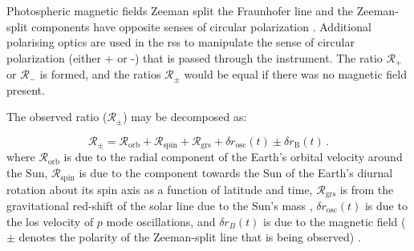 
Photospheric magnetic fields Zeeman split the Fraunhofer line and the Zeeman-split components have opposite senses of circular polarization \citep{chaplin_studies_2003}. Additional polarising optics are used in the \gls{rss} to manipulate the sense of circular polarization (either + or -) that is passed through the instrument. The ratio $\mathcal{R}_{+}$ or $\mathcal{R}_{-}$ is formed, and the ratios $\mathcal{R}_{\pm}$ would be equal if there was no magnetic field present.

The observed ratio ($\mathcal{R}_{\pm}$) may be decomposed as:

\begin{equation}
\mathcal{R}_{\pm} = \mathcal{R}_{\mathrm{orb}} + \mathcal{R}_{\mathrm{spin}} + \mathcal{R}_{\mathrm{grs}} + \delta {r}_{\mathrm{osc}}(t) \pm \delta {r}_{\mathrm{B}}(t) \, .
\label{eq:vel_comp}
\end{equation}
%
where $\mathcal{R}_{\mathrm{orb}}$ is due to the radial component of the Earth's orbital velocity around the Sun, $\mathcal{R}_{\mathrm{spin}}$ is due to the component towards the Sun of the Earth's diurnal rotation about its spin axis as a function of latitude and time, $\mathcal{R}_{\mathrm{grs}}$ is from the gravitational red-shift of the solar line due to the Sun's mass \citep{elsworth_techniques_1995, dumbill_observation_1999}, $\delta {r}_{\mathrm{osc}}(t)$ is due to the \gls{los} velocity of $p$ mode oscillations, and $\delta {r}_B(t)$ is due to the magnetic field ($\pm$ denotes the polarity of the Zeeman-split line that is being observed) \citep{dumbill_observation_1999}. 



